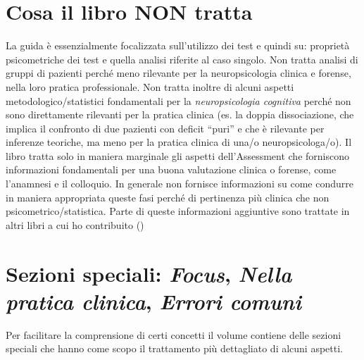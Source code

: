 \documentclass[
  italian,
  letterpaper,
  paper=A4,
  headinclude=on,
  footinclude=on,
  12pt]{scrbook}
\begin{document}
\section*{Cosa il libro NON tratta}\label{cosa-il-libro-non-tratta}


La guida è essenzialmente focalizzata sull'utilizzo dei test e quindi
su: proprietà psicometriche dei test e quella analisi riferite al caso
singolo. Non tratta analisi di gruppi di pazienti perché meno rilevante
per la neuropsicologia clinica e forense, nella loro pratica
professionale. Non tratta inoltre di alcuni aspetti
metodologico/statistici fondamentali per la \emph{neuropsicologia
cognitiva} perché non sono direttamente rilevanti per la pratica clinica
(es. la doppia dissociazione, che implica il confronto di due pazienti
con deficit ``puri'' e che è rilevante per inferenze teoriche, ma meno
per la pratica clinica di una/o neuropsicologa/o). Il libro tratta solo
in maniera marginale gli aspetti dell'Assessment che forniscono
informazioni fondamentali per una buona valutazione clinica o forense,
come l'anamnesi e il colloquio. In generale non fornisce informazioni su
come condurre in maniera appropriata queste fasi perché di pertinenza
più clinica che non psicometrico/statistica. Parte di queste
informazioni aggiuntive sono trattate in altri libri a cui ho
contribuito
(\cite{mondini2009valutazione,mondini2016semeiotica,mondini2022methodology})

\section*{\texorpdfstring{Sezioni speciali: \emph{Focus}, \emph{Nella
pratica clinica}, \emph{Errori
comuni}}{Sezioni speciali: Focus, Nella pratica clinica, Errori comuni}}\label{sezioni-speciali-focus-nella-pratica-clinica-errori-comuni}


Per facilitare la comprensione di certi concetti il volume contiene
delle sezioni speciali che hanno come scopo il trattamento più
dettagliato di alcuni aspetti.
\end{document}
